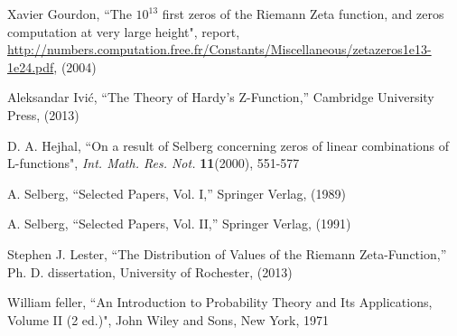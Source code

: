 \documentclass{mcom-l}
\theoremstyle{definition}
\theoremstyle{remark}
\numberwithin{equation}{section}
\begin{document}
\begin{thebibliography}{10}
 Xavier Gourdon,
``The $10^{13}$ first zeros of the Riemann Zeta function,
and zeros computation at very large height", report,
\url{http://numbers.computation.free.fr/Constants/Miscellaneous/zetazeros1e13-1e24.pdf}, (2004)

 Aleksandar Ivi\'c, ``The Theory of Hardy's Z-Function,''
Cambridge University Press,  (2013)

 D. A. Hejhal,
``On a result of Selberg concerning zeros of linear combinations
of L-functions", 
{\it Int. Math. Res. Not.} {\bf11}(2000), 551-577

 A. Selberg, ``Selected Papers, Vol. I,''
Springer Verlag,  (1989)

 A. Selberg, ``Selected Papers, Vol. II,''
Springer Verlag,  (1991)

 Stephen J. Lester, ``The Distribution of Values of the
Riemann Zeta-Function,''
Ph. D. dissertation, University of Rochester,  (2013)

 William feller,
``An Introduction to Probability Theory and Its Applications, Volume II (2 ed.)",
John Wiley and Sons, New York, 1971


\end{thebibliography} 
\end{document}
